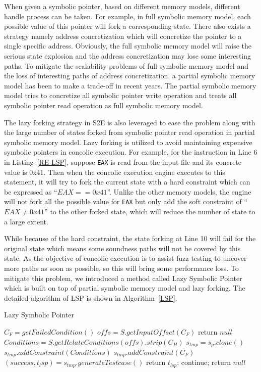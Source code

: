 When given a symbolic pointer, based on different memory models, different handle process can be taken. For example, in full symbolic memory model, each possible value of this pointer will fork a corresponding state. There also exists a strategy namely address concretization which will concretize the pointer to a single specific address. Obviously, the full symbolic memory model will raise the serious state explosion and the address concretization may lose some interesting paths. To mitigate the scalability problems of full symbolic memory model and the loss of interesting paths of address concretization, a partial symbolic memory model has been to make a trade-off in recent years. The partial symbolic memory model tries to concretize all symbolic pointer write operation and treats all symbolic pointer read operation as full symbolic memory model. 

The lazy forking strategy in S2E is also leveraged to ease the problem along with the large number of states forked from symbolic pointer read operation in partial symbolic memory model. Lazy forking is utilized to avoid maintaining expensive symbolic pointers in concolic execution. For example, for the instruction in Line 6 in Listing~\ref{RE-LSP}, suppose \texttt{EAX} is read from the input file and its concrete value is 0x41. Then when the concolic execution engine executes to this statement, it will try to fork the current state with a hard constraint which can be expressed as ``$EAX == 0x41$''. Unlike the other memory models, the engine will not fork all the possible value for \texttt{EAX} but only add the soft constraint of ``$EAX \neq 0x41$'' to the other forked state, which will reduce the number of state to a large extent. 

While because of the hard constraint, the state forking at Line 10 will fail for the original state which means some soundness paths will not be covered by this state. As the objective of concolic execution is to assist fuzz testing to uncover more paths as soon as possible, so this will bring some performance loss. To mitigate this problem, we introduced a method called Lazy Symbolic Pointer which is built on top of partial symbolic memory model and lazy forking. The detailed algorithm of LSP is shown in Algorithm~\ref{LSP}.


\begin{algorithm}
  \caption{Lazy Symbolic Pointer}
  \label{LSP}
  $C_F = getFailedCondition()$\;
  $offs = S.getInputOffset(C_F)$\;
  {
    return $null$\;
  }
  $Conditions = S.getRelateConditions(offs).strip(C_H)$\;
  {
    $s_{tmp} = s_p.clone()$\;
    $s_{tmp}.addConstraint(Conditions)$\;
    $s_{tmp}.addConstraint(C_F)$\;
    $(success, t_lsp) = s_{tmp}.generateTestcase()$\;
    {
      return $t_{lsp}$;
    } {
      continue;
    }
  }
  return $null$\;
\end{algorithm}
  
